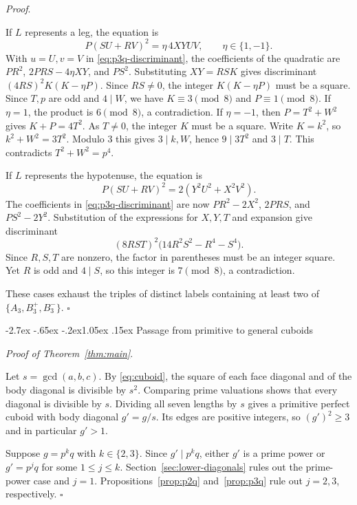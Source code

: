 \documentclass[11pt,a4paper,twoside]{article}
\makeatletter
\numberwithin{equation}{section}
\newcommand{\proseheadingstop}{.}
\providecommand{\proofname}{Proof}
\renewcommand{\section}{\@startsection{section}{1}{\z@}%
  {-2.7ex \@plus -.65ex \@minus -.2ex}{1.05ex \@plus .15ex}%
  {\normalfont\large\bfseries}}
\newenvironment{proof}[1][\proofname]{%
  \par\addvspace{.65\baselineskip}\noindent
  \textit{#1}\proseheadingstop\enspace\ignorespaces
}{%
  \unskip\nobreak\hfill\nobreak\(\square\)\par
  \addvspace{.65\baselineskip}
}
\makeatother
\begin{document}
\begin{proof}
If \(L\) represents a leg, the equation is
\[
P(SU+RV)^2=\eta\,4XYUV,\qquad \eta\in\{1,-1\}.
\]
With \(u=U,v=V\) in \eqref{eq:p3q-discriminant}, the coefficients of the quadratic are \(PR^2\), \(2PRS-4\eta XY\), and \(PS^2\). Substituting \(XY=RSK\) gives discriminant \((4RS)^2K(K-\eta P)\). Since \(RS\ne0\), the integer \(K(K-\eta P)\) must be a square. Since \(T,p\) are odd and \(4\mid W\), we have \(K\equiv3\pmod8\) and \(P\equiv1\pmod8\). If \(\eta=1\), the product is \(6\pmod8\), a contradiction. If \(\eta=-1\), then \(P=T^2+W^2\) gives \(K+P=4T^2\). As \(T\ne0\), the integer \(K\) must be a square. Write \(K=k^2\), so \(k^2+W^2=3T^2\). Modulo \(3\) this gives \(3\mid k,W\), hence \(9\mid3T^2\) and \(3\mid T\). This contradicts \(T^2+W^2=p^4\).

If \(L\) represents the hypotenuse, the equation is
\[
P(SU+RV)^2=2(Y^2U^2+X^2V^2).
\]
The coefficients in \eqref{eq:p3q-discriminant} are now \(PR^2-2X^2\), \(2PRS\), and \(PS^2-2Y^2\). Substitution of the expressions for \(X,Y,T\) and expansion give discriminant
\[
(8RST)^2\bigl(14R^2S^2-R^4-S^4\bigr).
\]
Since \(R,S,T\) are nonzero, the factor in parentheses must be an integer square. Yet \(R\) is odd and \(4\mid S\), so this integer is \(7\pmod8\), a contradiction.

These cases exhaust the triples of distinct labels containing at least two of \(\{A_3,B_3^+,B_3^-\}\).
\end{proof}

\section{Passage from primitive to general cuboids}
\label{sec:general}

\begin{proof}[Proof of Theorem~\ref{thm:main}]
Let \(s=\gcd(a,b,c)\). By \eqref{eq:cuboid}, the square of each face diagonal and of the body diagonal is divisible by \(s^2\). Comparing prime valuations shows that every diagonal is divisible by \(s\). Dividing all seven lengths by \(s\) gives a primitive perfect cuboid with body diagonal \(g'=g/s\). Its edges are positive integers, so \((g')^2\ge 3\) and in particular \(g'>1\).

Suppose \(g=p^kq\) with \(k\in\{2,3\}\). Since \(g'\mid p^kq\), either \(g'\) is a prime power or \(g'=p^jq\) for some \(1\le j\le k\). Section~\ref{sec:lower-diagonals} rules out the prime-power case and \(j=1\). Propositions~\ref{prop:p2q} and~\ref{prop:p3q} rule out \(j=2,3\), respectively.
\end{proof}
\end{document}
